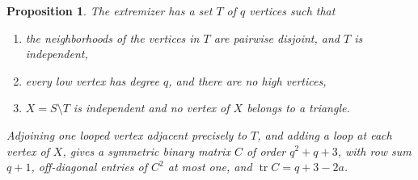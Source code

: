 \documentclass[11pt,reqno]{amsart}
\newtheorem{proposition}[theorem]{Proposition}
\theoremstyle{definition}
\theoremstyle{remark}
\numberwithin{equation}{section}
\DeclareMathOperator{\tr}{tr}
\begin{document}
\begin{proposition}\label{prop:completion}
The extremizer has a set \(T\) of \(q\) vertices such that
\begin{enumerate}
\item the neighborhoods of the vertices in \(T\) are pairwise disjoint,
      and \(T\) is independent,
\item every low vertex has degree \(q\), and there are no high vertices,
\item \(X=S\setminus T\) is independent and no vertex of \(X\) belongs
      to a triangle.
\end{enumerate}
Adjoining one looped vertex adjacent precisely to \(T\), and adding a
loop at each vertex of \(X\), gives a symmetric binary matrix \(C\)
of order \(q^2+q+3\), with row sum \(q+1\), off-diagonal entries of
\(C^2\) at most one, and \(\tr C=q+3-2a\).
\end{proposition}
\end{document}
